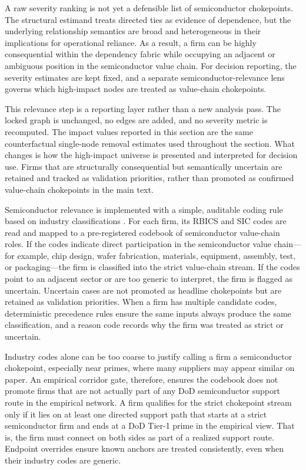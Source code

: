 A raw severity ranking is not yet a defensible list of semiconductor chokepoints. The structural estimand treats directed ties as evidence of dependence, but the underlying relationship semantics are broad and heterogeneous in their implications for operational reliance. As a result, a firm can be highly consequential within the dependency fabric while occupying an adjacent or ambiguous position in the semiconductor value chain. For decision reporting, the severity estimates are kept fixed, and a separate semiconductor-relevance lens governs which high-impact nodes are treated as value-chain chokepoints.

This relevance step is a reporting layer rather than a new analysis pass. The locked graph is unchanged, no edges are added, and no severity metric is recomputed. The impact values reported in this section are the same counterfactual single-node removal estimates used throughout the section. What changes is how the high-impact universe is presented and interpreted for decision use. Firms that are structurally consequential but semantically uncertain are retained and tracked as validation priorities, rather than promoted as confirmed value-chain chokepoints in the main text.

Semiconductor relevance is implemented with a simple, auditable coding rule based on industry classifications \parencite{factset_standard_2021}. For each firm, its RBICS and SIC codes are read and mapped to a pre-registered codebook of semiconductor value-chain roles. If the codes indicate direct participation in the semiconductor value chain---for example, chip design, wafer fabrication, materials, equipment, assembly, test, or packaging---the firm is classified into the strict value-chain stream. If the codes point to an adjacent sector or are too generic to interpret, the firm is flagged as uncertain. Uncertain cases are not promoted as headline chokepoints but are retained as validation priorities. When a firm has multiple candidate codes, deterministic precedence rules ensure the same inputs always produce the same classification, and a reason code records why the firm was treated as strict or uncertain.

Industry codes alone can be too coarse to justify calling a firm a semiconductor chokepoint, especially near primes, where many suppliers may appear similar on paper. An empirical corridor gate, therefore, ensures the codebook does not promote firms that are not actually part of any DoD semiconductor support route in the empirical network. A firm qualifies for the strict chokepoint stream only if it lies on at least one directed support path that starts at a strict semiconductor firm and ends at a DoD Tier-1 prime in the empirical view. That is, the firm must connect on both sides as part of a realized support route. Endpoint overrides ensure known anchors are treated consistently, even when their industry codes are generic.

